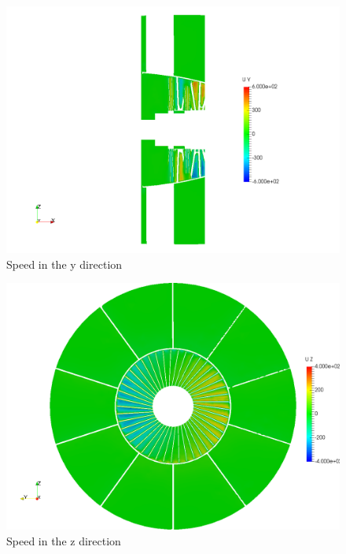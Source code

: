 \begin{figure}[h!]
\centering
\includegraphics[scale=0.28]{./img/screenshoots/Uy2.png}
\caption{Speed in the y direction}
\label{uy2}
\end{figure}

\newpage{}

\begin{figure}[h!]
\centering
\includegraphics[scale=0.28]{./img/screenshoots/Uz1.png}
\caption{Speed in the z direction}
\label{uz1}
\end{figure}

